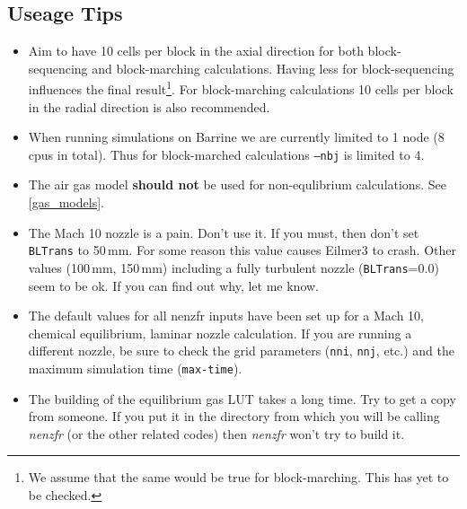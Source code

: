 \subsection{Useage Tips}
\begin{itemize}
\item Aim to have 10 cells per block in the axial direction for both block-sequencing and block-marching calculations. Having less for block-sequencing influences the final result\footnote{We assume that the same would be true for block-marching. This has yet to be checked.}. For block-marching calculations 10 cells per block in the radial direction is also recommended.
\item When running simulations on Barrine we are currently limited to 1 node (8 cpus in total). Thus for block-marched calculations \texttt{--nbj} is limited to 4.
\item The air gas model \textbf{should not} be used for non-equlibrium calculations. See \cref{gas_models}.
\item The Mach 10 nozzle is a pain. Don't use it. If you must, then don't set \texttt{BLTrans} to 50\,mm. For some reason this value causes Eilmer3 to crash. Other values (100\,mm, 150\,mm) including a fully turbulent nozzle (\texttt{BLTrans}=0.0) seem to be ok. If you can find out why, let me know.
\item The default values for all nenzfr inputs have been set up for a Mach 10, chemical equilibrium, laminar nozzle calculation. If you are running a different nozzle, be sure to check the grid parameters (\texttt{nni}, \texttt{nnj},  etc.) and the maximum simulation time (\texttt{max-time}).
\item The building of the equilibrium gas LUT takes a long time. Try to get a copy from someone. If you put it in the directory from which you will be calling \textit{nenzfr} (or the other related codes) then \textit{nenzfr} won't try to build it.
\end{itemize}

